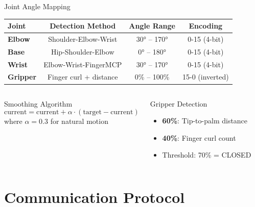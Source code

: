 \documentclass[aspectratio=169]{beamer}
\begin{document}
\begin{frame}{Joint Angle Mapping}
\begin{center}
\begin{tabular}{|l|c|c|c|}
\hline
\rowcolor{fpgablue!30}
\textbf{Joint} & \textbf{Detection Method} & \textbf{Angle Range} & \textbf{Encoding} \\
\hline
\textbf{Elbow} & Shoulder-Elbow-Wrist & 30° -- 170° & 0-15 (4-bit) \\
\hline
\textbf{Base} & Hip-Shoulder-Elbow & 0° -- 180° & 0-15 (4-bit) \\
\hline
\textbf{Wrist} & Elbow-Wrist-FingerMCP & 30° -- 170° & 0-15 (4-bit) \\
\hline
\textbf{Gripper} & Finger curl + distance & 0\% -- 100\% & 15-0 (inverted) \\
\hline
\end{tabular}
\end{center}

\vspace{0.5cm}

\begin{columns}
\begin{block}{Smoothing Algorithm}
$$\text{current} = \text{current} + \alpha \cdot (\text{target} - \text{current})$$
where $\alpha = 0.3$ for natural motion
\end{block}

\begin{block}{Gripper Detection}
\begin{itemize}
    \item \textbf{60\%}: Tip-to-palm distance
    \item \textbf{40\%}: Finger curl count
    \item Threshold: 70\% = CLOSED
\end{itemize}
\end{block}
\end{columns}
\end{frame}

\section{Communication Protocol}
\end{document}
